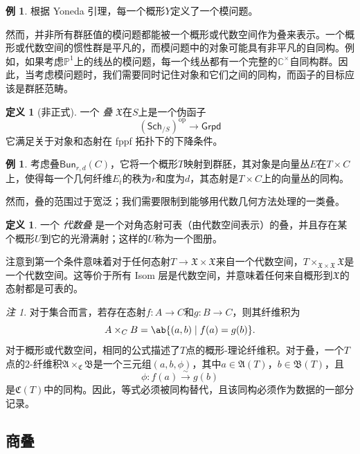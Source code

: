 \documentclass{amsart}
\theoremstyle{definition}
\newtheorem{defn}[thm]{定义}
\newtheorem{exm}[thm]{例}
\theoremstyle{remark}
\newtheorem{rmk}[thm]{注}
\theoremstyle{plain}
\theoremstyle{definition}
\theoremstyle{remark}
\newcommand{\C}{\mathbb{C}}
\renewcommand{\P}{\mathbb{P}}
\newcommand{\mf}[1]{\mathfrak{#1}}
\newcommand{\mr}[1]{\mathrm{#1}}
\newcommand{\ms}[1]{\mathsf{#1}}
\newcommand{\1}{\mathbf{1}}
\newcommand{\2}{\mathbf{2}}
\newcommand{\3}{\mathbf{3}}
\begin{document}
\begin{exm}
    根据 Yoneda 引理，每一个概形\(Y\)定义了一个模问题。
\end{exm}

    然而，并非所有群胚值的模问题都能被一个概形或代数空间作为叠来表示。一个概形或代数空间的惯性群是平凡的，而模问题中的对象可能具有非平凡的自同构。例如，如果考虑\(\P^1\)上的线丛的模问题，每一个线丛都有一个完整的\(\C^{\times}\)自同构群。因此，当考虑模问题时，我们需要同时记住对象和它们之间的同构，而函子的目标应该是群胚范畴。

\begin{defn}[非正式]
    一个 \textit{叠} \(\mf{X}\)在\(S\)上是一个伪函子
    \[ (\ms{Sch}_{/S})^{\mr{op}} \to \ms{Grpd} \]
    它满足关于对象和态射在 fppf 拓扑下的下降条件。
\end{defn}

\begin{exm}
    考虑叠\(\ms{Bun}_{r,d}(C)\)，它将一个概形\(T\)映射到群胚，其对象是向量丛\(E\)在\(T\times C\)上，使得每一个几何纤维\(E_{\bar t}\)的秩为\(r\)和度为\(d\)，其态射是\(T\times C\)上的向量丛的同构。
\end{exm}

    然而，叠的范围过于宽泛；我们需要限制到能够用代数几何方法处理的一类叠。

\begin{defn}
    一个 \textit{代数叠} 是一个对角态射可表（由代数空间表示）的叠，并且存在某个概形\(U\)到它的光滑满射；这样的\(U\)称为一个图册。
\end{defn}

    注意到第一个条件意味着对于任何态射\(T \to \mf{X} \times \mf{X}\)来自一个代数空间，\(T \times_{\mf{X} \times \mf{X}} \mf{X}\)是一个代数空间。这等价于所有 Isom 层是代数空间，并意味着任何来自概形到\(\mf{X}\)的态射都是可表的。

\begin{rmk}
    对于集合而言，若存在态射\(f\colon A\to C\)和\(g\colon B\to C\)，则其纤维积为
    \[ 
        A\times_C B=\ab\{(a,b)\mid f(a)=g(b)\}. 
    \] 
    对于概形或代数空间，相同的公式描述了\(T\)点的概形-理论纤维积。对于叠，一个\(T\)点的\(2\)-纤维积\(\mf{A}\times_{\mf{C}}\mf{B}\)是一个三元组\((a,b,\phi)\)，其中\(a\in\mf{A}(T)\)，\(b\in\mf{B}(T)\)，且
    \[ 
        \phi\colon f(a)\xrightarrow{\sim}g(b) 
    \]
是\(\mf{C}(T)\)中的同构。因此，等式必须被同构替代，且该同构必须作为数据的一部分记录。
\end{rmk}


\subsection{商叠}%
\label{sub:Quotient stacks}
\end{document}
